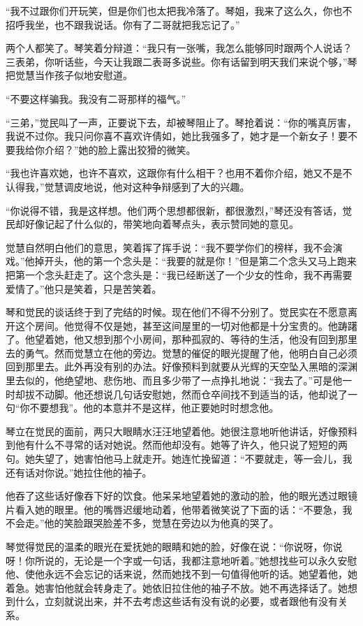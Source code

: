 \par “我不过跟你们开玩笑，但是你们也太把我冷落了。琴姐，我来了这么久，你也不招呼我坐，也不跟我说话。你有了二哥就把我忘记了。”
\par 两个人都笑了。琴笑着分辩道：“我只有一张嘴，我怎么能够同时跟两个人说话？三表弟，你听话些，今天让我跟二表哥多说些。你有话留到明天我们来说个够，”琴把觉慧当作孩子似地安慰道。
\par “不要这样骗我。我没有二哥那样的福气。”
\par “三弟，”觉民叫了一声，正要说下去，却被琴阻止了。琴抢着说：“你的嘴真厉害，我说不过你。我只问你喜不喜欢许倩如，她比我强多了，她才是一个新女子！要不要我给你介绍？”她的脸上露出狡猾的微笑。
\par “我也许喜欢她，也许不喜欢，这跟你有什么相干？也用不着你介绍，她又不是不认得我，”觉慧调皮地说，他对这种争辩感到了大的兴趣。
\par “你说得不错，我是这样想。他们两个思想都很新，都很激烈，”琴还没有答话，觉民却好像记起了什么似的，带笑地向着琴点头，表示赞同她的意见。
\par 觉慧自然明白他们的意思，笑着挥了挥手说：“我不要学你们的榜样，我不会演戏。”他掉开头，他的第一个念头是：“我要的就是你！”但是第二个念头又马上跑来把第一个念头赶走了。这个念头是：“我已经断送了一个少女的性命，我不再需要爱情了。”他只是笑着，只是苦笑着。
\par 琴和觉民的谈话终于到了完结的时候。现在他们不得不分别了。觉民实在不愿意离开这个房间。他觉得不仅是她，甚至这间屋里的一切对他都是十分宝贵的。他踌躇了。他望着她，他又想到那个小房间，那种孤寂的、等待的生活，他没有回到那里去的勇气。然而觉慧立在他的旁边。觉慧的催促的眼光提醒了他，他明白自己必须回到那里去。此外再没有别的办法。好像预料到就要从光辉的天空坠入黑暗的深渊里去似的，他绝望地、悲伤地、而且多少带了一点挣扎地说：“我去了。”可是他一时却拔不动脚。他还想说几句话安慰她，然而仓卒间找不到适当的话，他却说了一句“你不要想我”。他的本意并不是这样，他正要她时时想念他。
\par 琴立在觉民的面前，两只大眼睛水汪汪地望着他。她很注意地听他讲话，好像预料到他有什么不寻常的话对她说。然而他却没有。她等了许久，他只说了短短的两句。她失望了，她害怕他马上就走开。她连忙挽留道：“不要就走，等一会儿，我还有话对你说。”她拉住他的袖子。
\par 他吞了这些话好像吞下好的饮食。他呆呆地望着她的激动的脸，他的眼光透过眼镜片看入她的眼里。他的嘴唇迟缓地动着，他带着微笑说了下面的话：“不要急，我不会走。”他的笑脸跟哭脸差不多，觉慧在旁边以为他真的哭了。
\par 琴觉得觉民的温柔的眼光在爱抚她的眼睛和她的脸，好像在说：“你说呀，你说呀！你所说的，无论是一个字或一句话，我都注意地听着。”她想找些可以永久安慰他、使他永远不会忘记的话来说，然而她找不到一句值得他听的话。她望着他，她着急。她害怕他就会转身走了。她依旧拉住他的袖子不放。她不再选择话了。她想到什么，立刻就说出来，并不去考虑这些话有没有说的必要，或者跟他有没有关系。
